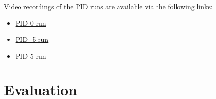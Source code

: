     \vspace{0.25em}\noindent Video recordings of the PID runs are available via the following links:
    \begin{itemize}
        \item \href{https://www.dropbox.com/scl/fo/qydc6hqrx3budknwzgmi1/ADdN0YC3AZ4ctg0SImbJqqI/Videos?preview=final_PID_0.mp4&rlkey=jcnhrcvje207wu5aaq48laen6&subfolder_nav_tracking=1&st=k76cp6vc&dl=0}{\color{blue}\underline{PID 0\textdegree{} run}}
        \item \href{https://www.dropbox.com/scl/fo/qydc6hqrx3budknwzgmi1/ADdN0YC3AZ4ctg0SImbJqqI/Videos?preview=final_PID_neg5.mp4&rlkey=jcnhrcvje207wu5aaq48laen6&subfolder_nav_tracking=1&st=log0nht8&dl=0}{\color{blue}\underline{PID -5\textdegree{} run}}
        \item \href{https://www.dropbox.com/scl/fo/qydc6hqrx3budknwzgmi1/ADdN0YC3AZ4ctg0SImbJqqI/Videos?preview=final_PID_0.mp4&rlkey=jcnhrcvje207wu5aaq48laen6&subfolder_nav_tracking=1&st=k76cp6vc&dl=0}{\color{blue}\underline{PID 5\textdegree{} run}}
    \end{itemize}

\section{Evaluation}

